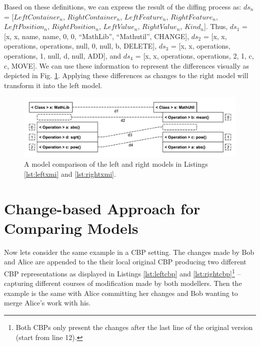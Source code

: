 \documentclass{jot}
\begin{document}
Based on these definitions, we can express the result of the diffing process as: $ds_{n}$ = [$LeftContainer_n$, $RightContainer_n$, $LeftFeature_n$, $RightFeature_n$, $LeftPosition_n$, $RightPosition_n$, $LeftValue_n$, $RightValue_n$, $Kind_n$]. Thus, $ds_{1}$ =  [\textsf{x}, \textsf{x}, \textsf{name}, \textsf{name}, 0, 0, ``MathLib'', ``Mathutil'', \textsf{CHANGE}], $ds_{2}$ = [\textsf{x}, \textsf{x}, \textsf{operations}, \textsf{operations}, null, 0, null, \textsf{b}, \textsf{DELETE}], $ds_{3}$ = [\textsf{x}, \textsf{x}, \textsf{operations}, \textsf{operations}, 1, null, \textsf{d}, null, \textsf{ADD}], and $ds_{4}$ = [\textsf{x}, \textsf{x}, \textsf{operations}, \textsf{operations}, 2, 1, \textsf{c}, \textsf{c}, \textsf{MOVE}]. We can use these information to represent the differences visually as depicted in Fig. \ref{fig:xmi_comparison}. Applying these differences as changes to the right model will transform it into the left model.  

\begin{figure}
    \includegraphics[width=\linewidth]{XmiComparison}
    \caption{A model comparison of the left and right models in Listings \ref{lst:leftxmi} and \ref{lst:rightxmi}.}
    \label{fig:xmi_comparison}
\end{figure}

\section{Change-based Approach for Comparing Models}
\label{sec:change_based_approach_for_comparing_models}

Now lets consider the same example in a CBP setting.
The changes made by Bob and Alice are appended to the their local original CBP producing two different CBP representations as displayed in Listings \ref{lst:leftcbp} and \ref{lst:rightcbp}\footnote{Both CBPs only present the changes after the last line of the original version (start from line 12).} -- capturing different courses of modification made by both modellers.
Then the example is the same with Alice committing her changes and Bob wanting to merge Alice's work with his. 
\end{document}
